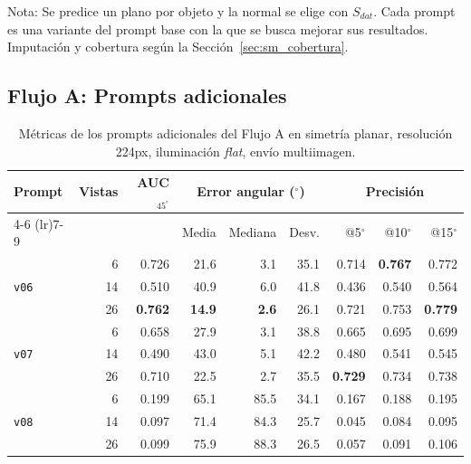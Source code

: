 \begin{table}[H]
\vspace{1.5ex}
\begin{minipage}{\textwidth}
Nota: Se predice un plano por objeto y la normal se elige con $S_{dat}$. Cada prompt es una variante del prompt base con la que se busca mejorar sus resultados. Imputación y cobertura según la Sección~\ref{sec:sm_cobertura}.
\end{minipage}
\end{table}



\newpage
\clearpage
\subsection{Flujo A: Prompts adicionales}

\begin{table}[H]
\centering
\caption{Métricas de los prompts adicionales del Flujo A en simetría planar, resolución 224px, iluminación \textit{flat}, envío multiimagen.}
\label{tab:nov_plane_adicionales}
\footnotesize
\setlength{\tabcolsep}{3pt}
\renewcommand{\arraystretch}{0.95}

\begin{tabular*}{\textwidth}{@{\extracolsep{\fill}}lrrrrrrrr@{}}
\toprule
\multirow{2}{*}{Prompt} & \multirow{2}{*}{Vistas} & \multirow{2}{*}{AUC$_{45^\circ}$} & \multicolumn{3}{c}{Error angular ($^\circ$)} & \multicolumn{3}{c}{Precisión} \\
\cmidrule(lr){4-6} \cmidrule(lr){7-9}
 &  &  & Media & Mediana & Desv. & @5$^\circ$ & @10$^\circ$ & @15$^\circ$ \\
\midrule
\multirow{3}{*}{\texttt{v06}} & 6 & 0.726 & 21.6 & 3.1 & 35.1 & 0.714 & \textbf{0.767} & 0.772 \\
 & 14 & 0.510 & 40.9 & 6.0 & 41.8 & 0.436 & 0.540 & 0.564 \\
 & 26 & \textbf{0.762} & \textbf{14.9} & \textbf{2.6} & 26.1 & 0.721 & 0.753 & \textbf{0.779} \\
\midrule
\multirow{3}{*}{\texttt{v07}} & 6 & 0.658 & 27.9 & 3.1 & 38.8 & 0.665 & 0.695 & 0.699 \\
 & 14 & 0.490 & 43.0 & 5.1 & 42.2 & 0.480 & 0.541 & 0.545 \\
 & 26 & 0.710 & 22.5 & 2.7 & 35.5 & \textbf{0.729} & 0.734 & 0.738 \\
\midrule
\multirow{3}{*}{\texttt{v08}} & 6 & 0.199 & 65.1 & 85.5 & 34.1 & 0.167 & 0.188 & 0.195 \\
 & 14 & 0.097 & 71.4 & 84.3 & 25.7 & 0.045 & 0.084 & 0.095 \\
 & 26 & 0.099 & 75.9 & 88.3 & 26.5 & 0.057 & 0.091 & 0.106 \\
\bottomrule
\end{tabular*}


\end{table}
